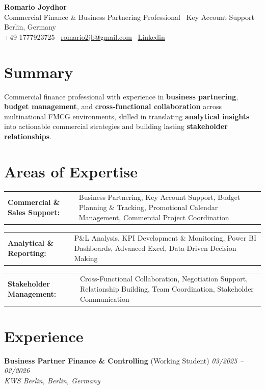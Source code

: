 \documentclass[a4paper,10pt]{article}
\makeatletter
\newcommand{\skillgroup}[2]{%
  \noindent
  \begin{tabular}{@{}>{\RaggedRight\arraybackslash}p{4.0cm}@{\hspace{0.2cm}}>{\justifying\arraybackslash}p{\dimexpr\linewidth-4.0cm-0.4cm\relax}@{}}
    \textbf{#1} & #2 \tabularnewline
  \end{tabular}%
  \vspace{2pt}
}
\makeatother
\begin{document}
\begin{center}
    {\LARGE \textbf{Romario Joydhor}} \\[4pt]
    \textcolor{subtle}{Commercial Finance \& Business Partnering Professional \textbar\ Key Account Support} \\[4pt]
    Berlin, Germany \\[4pt]
    +49 1777923725 \textbullet\
    \href{mailto:romario2jb@gmail.com}{romario2jb@gmail.com} \textbullet\
    \href{https://www.linkedin.com/in/romario2jb/}{Linkedin}
\end{center}
\vspace{4pt}

\section*{Summary}
Commercial finance professional with experience in \textbf{business partnering}, \textbf{budget management}, and \textbf{cross-functional collaboration} across multinational FMCG environments, skilled in translating \textbf{analytical insights} into actionable commercial strategies and building lasting \textbf{stakeholder relationships}.

\section*{Areas of Expertise}
\skillgroup{Commercial \& Sales Support:}{%
Business Partnering, Key Account Support, Budget Planning \& Tracking, Promotional Calendar Management, Commercial Project Coordination%
}
\skillgroup{Analytical \& Reporting:}{%
P\&L Analysis, KPI Development \& Monitoring, Power BI Dashboards, Advanced Excel, Data-Driven Decision Making%
}
\skillgroup{Stakeholder Management:}{%
Cross-Functional Collaboration, Negotiation Support, Relationship Building, Team Coordination, Stakeholder Communication%
}


\section*{Experience}

\textbf{Business Partner Finance \& Controlling} (Working Student)
\hfill \textit{03/2025 – 02/2026}\\
\textit{KWS Berlin, Berlin, Germany}\\
\end{document}
